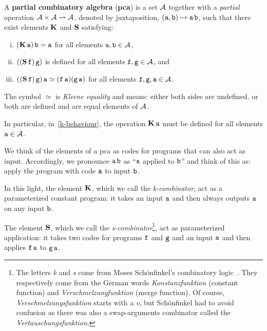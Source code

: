 \begin{definition}\label{def:pca}
  A \textbf{partial combinatory algebra} (\textbf{pca}) is a set \(\AA\) together with a \emph{partial}
  operation \(\AA \times \AA \pto \AA\), denoted by juxtaposition,
  \((\pca{a},\pca{b}) \mapsto \pca{a}\pca{b}\), such that there exist elements \(\kcomb\) and \(\scomb\)
  satisfying:
  \begin{enumerate}[(i)]
  \item\label{k-behaviour} \((\kcomb \pca{a}) \pca{b} = \pca{a}\) for all elements
    \(\pca{a},\pca{b} \in \AA\),
  \item\label{s-defined} \(((\scomb \pca{f}) \pca{g})\) is defined for all elements
    \(\pca{f},\pca{g} \in \AA\), and
  \item\label{s-behaviour}
    \(((\scomb \pca{f}) \pca{g}) \pca{a} \simeq
    (\pca{f}\pca{a})(\pca{g}\pca{a})\) for all elements
    \(\pca{f},\pca{g},\pca{a} \in \AA\).
  \end{enumerate}
  The symbol \(\simeq\) is \emph{Kleene equality} and means: either both sides
  are undefined, or both are defined and are equal elements of \(\AA\).
  \begin{samepage}
  In particular, in~\ref{k-behaviour}, the operation \(\kcomb\pca{a}\) must be
  defined for all elements \(\pca{a} \in \AA\).
  \end{samepage}
\end{definition}

We think of the elements of a pca as codes for programs that can also act as
input. Accordingly, we pronounce \(\pca{a}\pca{b}\) as ``\(\pca{a}\) applied to
\(\pca{b}\)'' and think of this as: apply the program with code \(\pca{a}\) to
input \(\pca{b}\).

In this light, the element \(\kcomb\), which we call the \emph{k-combinator}, act
as a parameterized constant program: it takes an input \(\pca{a}\) and then
always outputs \(\pca{a}\) on any input \(\pca{b}\).

The element \(\scomb\), which we call the \emph{s-combinator}\footnote{The
  letters \emph{k} and \emph{s} come from Moses Sch\"onfinkel's combinatory
  logic~\cite{Schonfinkel1924}. They respectively come from the German words
  \emph{Konstanzfunktion} (constant function) and \emph{Verschmelzungfunktion}
  (merge function). Of course, \emph{Verschmelzungsfunktion} starts with a
  \emph{v}, but Sch\"onfinkel had to avoid confusion as there was also a
  swap-arguments combinator called the \emph{Vertauschungsfunktion}.}, act as
parameterized application: it takes two codes for programs \(\pca{f}\) and
\(\pca{g}\) and an input \(\pca{a}\) and then applies \(\pca{f}\pca{a}\) to
\(\pca{g}\pca{a}\).

